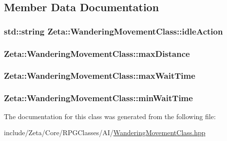 \subsection{Member Data Documentation}
\hypertarget{classZeta_1_1WanderingMovementClass_a2db670eea2c6217c3d91647d8172776e}{
\subsubsection[{idle\+Action}]{\setlength{\rightskip}{0pt plus 5cm}std\+::string Zeta\+::\+Wandering\+Movement\+Class\+::idle\+Action\hspace{0.3cm}{\ttfamily [private]}}}\label{classZeta_1_1WanderingMovementClass_a2db670eea2c6217c3d91647d8172776e}
\hypertarget{classZeta_1_1WanderingMovementClass_abc4c3a8c1cf7f51c15d148e7ae86038f}{
\subsubsection[{max\+Distance}]{ Zeta\+::\+Wandering\+Movement\+Class\+::max\+Distance\hspace{0.3cm}{\ttfamily [private]}}}\label{classZeta_1_1WanderingMovementClass_abc4c3a8c1cf7f51c15d148e7ae86038f}
\hypertarget{classZeta_1_1WanderingMovementClass_ae97392211202f727957d23418c46402d}{
\subsubsection[{max\+Wait\+Time}]{ Zeta\+::\+Wandering\+Movement\+Class\+::max\+Wait\+Time\hspace{0.3cm}{\ttfamily [private]}}}\label{classZeta_1_1WanderingMovementClass_ae97392211202f727957d23418c46402d}
\hypertarget{classZeta_1_1WanderingMovementClass_aee8968ff6eeb6249748f20c71805de81}{
\subsubsection[{min\+Wait\+Time}]{ Zeta\+::\+Wandering\+Movement\+Class\+::min\+Wait\+Time\hspace{0.3cm}{\ttfamily [private]}}}\label{classZeta_1_1WanderingMovementClass_aee8968ff6eeb6249748f20c71805de81}


The documentation for this class was generated from the following file\+:\begin{DoxyCompactItemize}
\item 
include/\+Zeta/\+Core/\+R\+P\+G\+Classes/\+A\+I/\hyperlink{WanderingMovementClass_8hpp}{Wandering\+Movement\+Class.\+hpp}\end{DoxyCompactItemize}
